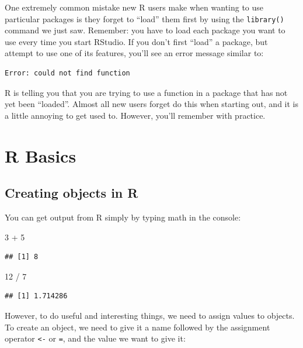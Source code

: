 \documentclass[
]{book}
\newenvironment{Shaded}{\begin{snugshade}}{\end{snugshade}}
\newcommand{\DecValTok}[1]{\textcolor[rgb]{0.00,0.00,0.81}{#1}}
\newcommand{\SpecialCharTok}[1]{\textcolor[rgb]{0.00,0.00,0.00}{#1}}
\begin{document}
One extremely common mistake new R users make when wanting to use particular packages is they forget to ``load'' them first by using the \texttt{library()} command we just saw. Remember: you have to load each package you want to use every time you start RStudio. If you don't first ``load'' a package, but attempt to use one of its features, you'll see an error message similar to:

\begin{verbatim}
Error: could not find function
\end{verbatim}

R is telling you that you are trying to use a function in a package that has not yet been ``loaded''. Almost all new users forget do this when starting out, and it is a little annoying to get used to. However, you'll remember with practice.

\hypertarget{r-basics}{%
\chapter{R Basics}\label{r-basics}}

\hypertarget{creating-objects-in-r}{%
\section{Creating objects in R}\label{creating-objects-in-r}}

You can get output from R simply by typing math in the console:

\begin{Shaded}
\begin{Highlighting}[]
\DecValTok{3} \SpecialCharTok{+} \DecValTok{5}
\end{Highlighting}
\end{Shaded}

\begin{verbatim}
## [1] 8
\end{verbatim}

\begin{Shaded}
\begin{Highlighting}[]
\DecValTok{12} \SpecialCharTok{/} \DecValTok{7}
\end{Highlighting}
\end{Shaded}

\begin{verbatim}
## [1] 1.714286
\end{verbatim}

However, to do useful and interesting things, we need to assign values to objects. To create an object, we need to give it a name followed by the assignment operator \texttt{\textless{}-} or \texttt{=}, and the value we want to give it:
\end{document}
